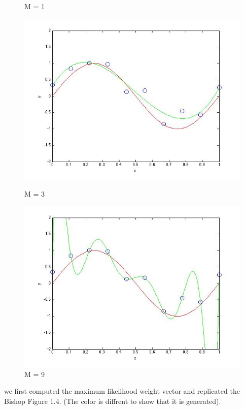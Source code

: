 \begin{figure}[!htb]
  \caption{M = 1}\label{fig:figures/p2_M=1}
\endminipage\hfill
{}                                                                            
  \includegraphics[width=\linewidth]{figures/p2_MLE_M=3}
  \caption{M = 3}\label{fig:figures/p2_M=3}
\endminipage\hfill
{}                                                                            
  \includegraphics[width=\linewidth]{figures/p2_MLE_M=9}
  \caption{M = 9}\label{fig:figures/p2_M=9}
\endminipage\hfill
\end{figure}

we first computed the maximum likelihood weight vector and replicated 
the Bishop Figure 1.4. (The color is diffrent to show that it is generated). 



